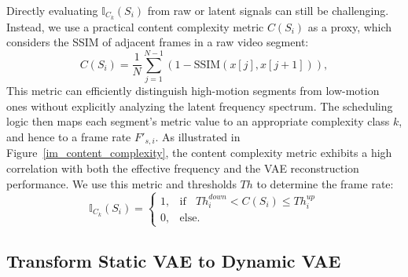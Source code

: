 Directly evaluating $\mathbb{I}_{C_k}(S_i)$ from raw or latent signals can still be challenging. 
Instead, we use a practical content complexity metric $C(S_i)$ as a proxy, which considers the SSIM of adjacent frames in a raw video segment: 
\begin{equation}
C(S_i) = \frac{1}{N}\sum_{j=1}^{N-1} (1-\text{SSIM}(x[j],x[j+1])),
\end{equation}
This metric can efficiently distinguish high-motion segments from low-motion ones without explicitly analyzing the latent frequency spectrum. The scheduling logic then maps each segment's metric value to an appropriate complexity class $k$, and hence to a frame rate $F'_{s,i}$. 
As illustrated in Figure~\ref{im_content_complexity}, the content complexity metric exhibits a high correlation with both the effective frequency and the VAE reconstruction performance.
We use this metric and thresholds $Th$ to determine the frame rate:
\begin{equation} 
\label{eq_complexity_threshold}
\mathbb{I}_{C_k}(S_i) = 
\begin{cases} 1, & \text{if}~~~~Th^{down}_{i}<C(S_i)\le Th^{up}_{i} \\
0, & \text{else}. \end{cases} 
\end{equation} 








\subsection{Transform Static VAE to Dynamic VAE}
\label{subsec:dflr_vae}


